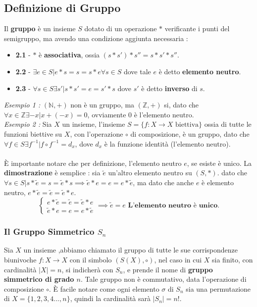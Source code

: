 \documentclass[12pt, letterpaper]{article}
\begin{document}
\subsection{Definizione di Gruppo}
Il \textbf{gruppo} è un insieme \(S\) dotato di un operazione \(*\) verificante i punti del semigruppo, ma avendo una 
condizione aggiunta necessaria :
\begin{itemize}
    \item \textbf{2.1} - \(*\) è \textbf{associativa}, ossia \((s*s')*s''=s*s'*s''\).
    \item \textbf{2.2} - \(\exists e \in S | e*s=s=s*e \forall s\in S\) dove tale \(e\) è detto \textbf{elemento neutro}.
    \item \textbf{2.3} - \( \forall s\in S \exists s' | s*s'=e=s'*s\) dove \(s'\) è detto \textbf{inverso} di \(s\).
\end{itemize}
\textit{Esempio 1 :} \((\mathbb{N},+)\) non è un gruppo, ma \((\mathbb{Z},+)\) si, dato che \(\forall x\in\mathbb{Z} 
\exists -x | x+(-x)=0\), ovviamente \(0\) è l'elemento neutro.\\
\textit{Esempio 2 :} Sia \(X\) un insieme, l'insieme \(S=\{f:X\rightarrow X \text{ biettiva}\}\) ossia di tutte 
le funzioni biettive su \(X\), con l'operazione \(\circ\) di composizione, è un gruppo, dato che 
\(\forall f \in S \exists f^{-1} | f\circ f^{-1} = d_x\), dove \(d_x\) è la funzione identità (l'elemento neutro).\\
\hphantom{.}\\È importante notare che per definizione, l'elemento neutro \(e\), se esiste è unico. La \textbf{dimostrazione}
è semplice : sia \(\tilde{e}\) un'altro elemento neutro su \((S,*)\). dato che \(\forall s\in S|s*\tilde{e}=s=\tilde{e}*s\implies 
\tilde{e}*e=e=e*\tilde{e}\), ma dato che anche \(e\) è elemento neutro, \(e*\tilde{e}=\tilde{e}=\tilde{e}*e\).\begin{equation}
    \begin{cases}
        e*\tilde{e}=\tilde{e}=\tilde{e}*e\\
        \tilde{e}*e=e=e*\tilde{e}
    \end{cases}
    \implies \tilde{e}=e \textbf{ L'elemento neutro è unico.}
\end{equation}
\subsubsection{Il Gruppo Simmetrico \(S_n\)}\label{Sim1}
Sia \(X\) un insieme ,abbiamo chiamato il gruppo di tutte le sue corrispondenze biunivoche
 \(f:X\rightarrow X\) con il simbolo \((S(X),\circ)\), nel caso in cui \(X\) sia finito, con cardinalità 
 \(|X|=n\), si indicherà con \(S_n\), e prende il nome di \textbf{gruppo simmetrico di grado \(n\)}. Tale gruppo 
 non è commutativo, data l'operazione di composizione \(\circ\). È facile notare come ogni elemento \(\sigma\) di 
 \(S_n\) sia una permutazione di \(X=\{1,2,3,4...,n\}\), quindi la cardinalità sarà \(|S_n|=n!\). \\
\end{document}
